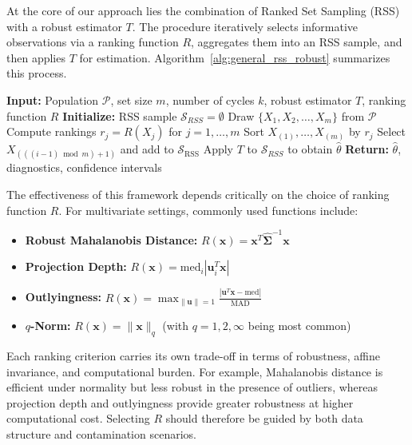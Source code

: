 \documentclass[12pt]{article}
\begin{document}
At the core of our approach lies the combination of Ranked Set Sampling (RSS) with a robust estimator $T$. The procedure iteratively selects informative observations via a ranking function $R$, aggregates them into an RSS sample, and then applies $T$ for estimation. Algorithm~\ref{alg:general_rss_robust} summarizes this process.

\begin{algorithm}[H]
\caption{General RSS-Enhanced Robust Estimation}
\label{alg:general_rss_robust}
\begin{algorithmic}[1]
\State \textbf{Input:} Population $\mathcal{P}$, set size $m$, number of cycles $k$, robust estimator $T$, ranking function $R$
\State \textbf{Initialize:} RSS sample $\mathcal{S}_{RSS} = \emptyset$
    \State Draw $\{X_1, X_2, \ldots, X_m\}$ from $\mathcal{P}$
    \State Compute rankings $r_j = R(X_j)$ for $j=1,\ldots,m$
    \State Sort $X_{(1)}, \ldots, X_{(m)}$ by $r_j$
    \State Select $X_{(((i-1) \bmod m) + 1)}$ and add to $\mathcal{S}_{\mathrm{RSS}}$
\EndFor
\State Apply $T$ to $\mathcal{S}_{RSS}$ to obtain $\hat{\theta}$
\State \textbf{Return:} $\hat{\theta}$, diagnostics, confidence intervals
\end{algorithmic}
\end{algorithm}

The effectiveness of this framework depends critically on the choice of ranking function $R$. For multivariate settings, commonly used functions include:
\begin{itemize}
    \item \textbf{Robust Mahalanobis Distance:} $R(\mathbf{x}) = \mathbf{x}^T \hat{\boldsymbol{\Sigma}}^{-1} \mathbf{x}$
    \item \textbf{Projection Depth:} $R(\mathbf{x}) = \mathrm{med}_i |\mathbf{u}_i^T \mathbf{x}|$
    \item \textbf{Outlyingness:} $R(\mathbf{x}) = \max_{\|\mathbf{u}\|=1} \frac{|\mathbf{u}^T \mathbf{x} - \mathrm{med}|}{\mathrm{MAD}}$
    \item \textbf{$q$-Norm:} $R(\mathbf{x}) = \|\mathbf{x}\|_q$ (with $q=1,2,\infty$ being most common)
\end{itemize}

Each ranking criterion carries its own trade-off in terms of robustness, affine invariance, and computational burden. For example, Mahalanobis distance is efficient under normality but less robust in the presence of outliers, whereas projection depth and outlyingness provide greater robustness at higher computational cost. Selecting $R$ should therefore be guided by both data structure and contamination scenarios.
\end{document}
